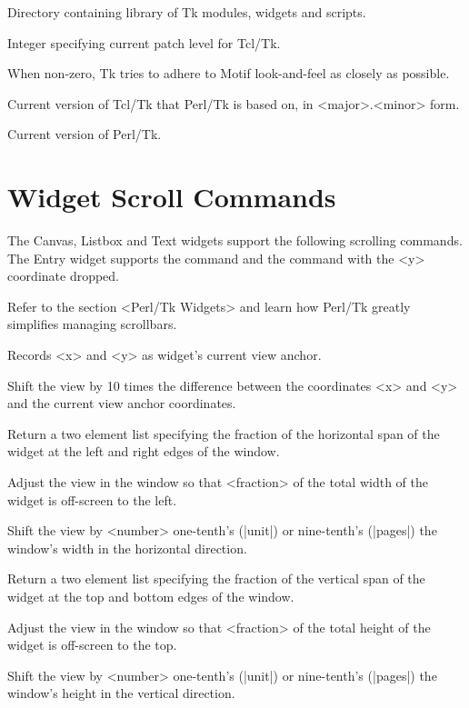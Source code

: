 \begin{enum}{1cm}
 
Directory containing library of Tk modules, widgets and scripts.

Integer specifying current patch level for Tcl/Tk.

When non-zero, Tk tries to adhere to Motif look-and-feel as closely
as possible.

Current version of Tcl/Tk that Perl/Tk is based on, in <major>.<minor> form.

Current version of Perl/Tk.

\end{enum}

\section{Widget Scroll Commands}

The Canvas, Listbox and Text widgets support the following scrolling commands.
The Entry widget supports the  command and the  command 
with the <y> coordinate dropped.

Refer to the section <Perl/Tk Widgets> and learn how
Perl/Tk greatly simplifies managing scrollbars.

\begin{enum}{1cm}

Records <x> and <y> as widget's current view anchor.

Shift the view by 10 times the difference between the coordinates <x>
and <y> and the current view anchor coordinates.

Return a two element list specifying the fraction of the horizontal span
of the widget at the left and right edges of the window.

Adjust the view in the window so that <fraction> of the total width
of the widget is off-screen to the left.

Shift the view by <number> one-tenth's (|unit|) or nine-tenth's (|pages|)
the window's width in the horizontal direction. 

Return a two element list specifying the fraction of the vertical span
of the widget at the top and bottom edges of the window.

Adjust the view in the window so that <fraction> of the total height
of the widget is off-screen to the top.

Shift the view by <number> one-tenth's (|unit|) or nine-tenth's (|pages|)
the window's height in the vertical direction. 

\end{enum}

